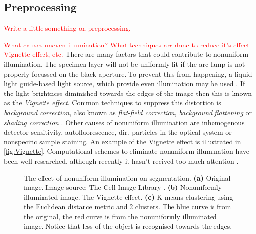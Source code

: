 \subsection{Preprocessing}
\textcolor{red}{Write a little something on preprocessing.}

\begin{definition}
	\textcolor{red}{What causes uneven illumination? What techniques are done to reduce it's effect. Vignette effect, etc.}
	There are many factors that could contribute to nonuniform illumination.
	The specimen layer will not be uniformly lit if the  arc lamp is not properly focussed on the black aperture.
	To prevent this from happening, a liquid light guide-based light source, which provide even illumination may be used \citep{LichtmanConchello2005}.
	If the light brightness diminished towards the edges of the image then this is known as the \textit{Vignette effect}.
	Common techniques to suppress this distortion is \textit{background correction}, also known as \textit{flat-field correction}, \textit{background flattening} or \textit{shading correction} \citep{Danek2012,Fatima2008,Murphy2001}.
	Other causes of nonuniform illumination are inhomogenous detector sensitivity, autofluorescence, dirt particles in the optical system or nonspecific sample staining.
	An example of the Vignette effect is illustrated in \autoref{fig:Vignette}.
	Computational schemes to eliminate nonuniform illumination have been well researched, although recently it hasn't recived too much attention \citep{Young2001,Ghauharali1998,Model2001,Model2001_2}.
	
	\begin{figure}[!t]
		\centering
		\caption{The effect of nonuniform illumination on segmentation. \textbf{(a)} Original image. Image source: The Cell Image Library \citep{cil:21739}. \textbf{(b)} Nonuniformly illuminated image. The Vignette effect. \textbf{(c)} K-means clustering using the Euclidean distance metric and 2 clusters. The blue curve is from the original, the red curve is from the nonuniformly illuminated image. Notice that less of the object is recognised towards the edges.}
		\label{fig:illumination}
	\end{figure}
\end{definition}

